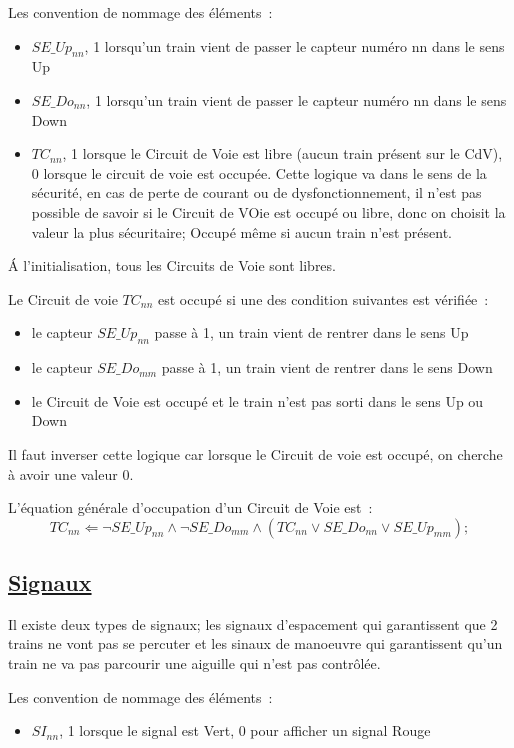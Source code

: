 Les convention de nommage des éléments~:
\begin{itemize}
\item $SE\_Up_{nn}$, 1 lorsqu'un train vient de passer le capteur numéro
  nn dans le sens Up
\item $SE\_Do_{nn}$, 1 lorsqu'un train vient de passer le capteur numéro
  nn dans le sens Down
\item $TC_{nn}$, 1 lorsque le Circuit de Voie est libre (aucun train
  présent sur le CdV), 0 lorsque le circuit de voie est occupée. Cette
  logique va dans le sens de la sécurité, en cas de perte de courant
  ou de dysfonctionnement, il n'est pas possible de savoir si le
  Circuit de VOie est occupé ou libre, donc on choisit la valeur la
  plus sécuritaire; Occupé même si aucun train n'est présent.
\end{itemize}

\'A l'initialisation, tous les Circuits de Voie sont libres.

\medskip
Le Circuit de voie $TC_{nn}$ est occupé si une des condition suivantes
est vérifiée~:
\begin{itemize}
\item le capteur $SE\_Up_{nn}$ passe à 1, un train vient de rentrer dans
  le sens Up
\item le capteur $SE\_Do_{mm}$ passe à 1, un train vient de rentrer dans
  le sens Down
\item le Circuit de Voie est occupé et le train n'est pas sorti dans
  le sens Up ou Down
\end{itemize}

Il faut inverser cette logique car lorsque le Circuit de voie est
occupé, on cherche à avoir une valeur 0.

\medskip
L'équation générale d'occupation d'un Circuit de Voie est~:
$$\boxed{
  TC_{nn} \Leftarrow \neg SE\_Up_{nn} \land \neg SE\_Do_{mm} \land
  (TC_{nn} \lor SE\_Do_{nn} \lor SE\_Up_{mm});
}$$


\subsection{\underline{Signaux}}
\label{sec:esp}

Il existe deux types de signaux; les signaux d'espacement qui
garantissent que 2 trains ne vont pas se percuter et les sinaux de
manoeuvre qui garantissent qu'un train ne va pas parcourir une
aiguille qui n'est pas contrôlée.

Les convention de nommage des éléments~:
\begin{itemize}
\item $SI_{nn}$, 1 lorsque le signal est Vert, 0 pour afficher un signal
  Rouge
\end{itemize}

